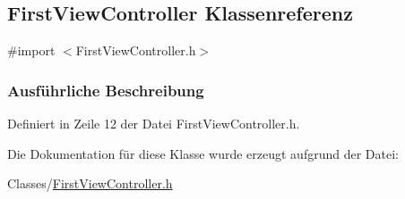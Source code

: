 \hypertarget{interface_first_view_controller}{
\subsection{FirstViewController Klassenreferenz}
\label{interface_first_view_controller}
}


{\ttfamily \#import $<$FirstViewController.h$>$}

\subsubsection{Ausführliche Beschreibung}


Definiert in Zeile 12 der Datei FirstViewController.h.

Die Dokumentation für diese Klasse wurde erzeugt aufgrund der Datei:\begin{DoxyCompactItemize}
\item 
Classes/\hyperlink{_first_view_controller_8h}{FirstViewController.h}\end{DoxyCompactItemize}
